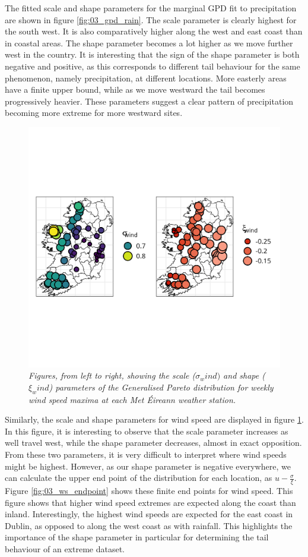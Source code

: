 \documentclass{article}
\numberwithin{equation}{section}
\begin{document}
The fitted scale and shape parameters for the marginal GPD fit to precipitation are shown in figure \ref{fig:03_gpd_rain}.
The scale parameter is clearly highest for the south west. 
It is also comparatively higher along the west and east coast than in coastal areas.
The shape parameter becomes a lot higher as we move further west in the country. 
It is interesting that the sign of the shape parameter is both negative and positive, as this corresponds to different tail behaviour for the same phenomenon, namely precipitation, at different locations.
More easterly areas have a finite upper bound, while as we move westward the tail becomes progressively heavier.
These parameters suggest a clear pattern of precipitation becoming more extreme for more westward sites.

\begin{figure}[H]
    \centering
    \includegraphics[width = 0.9\linewidth]{plots/033_gpd_ws.png}
    \caption{\emph{Figures, from left to right, showing the scale ($\sigma_wind)$ and shape ($\xi_wind$) parameters of the Generalised Pareto distribution for weekly wind speed maxima at each Met Éireann weather station.}}
    \label{fig:03_gpd_ws}
\end{figure}

Similarly, the scale and shape parameters for wind speed are displayed in figure \ref{fig:03_gpd_ws}.
In this figure, it is interesting to observe that the scale parameter increases as well travel west, while the shape parameter decreases, almost in exact opposition.
From these two parameters, it is very difficult to interpret where wind speeds might be highest. 
However, as our shape parameter is negative everywhere, we can calculate the upper end point of the distribution for each location, as $u - \frac{\sigma}{\xi}$.
Figure \ref{fig:03_ws_endpoint} shows these finite end points for wind speed.
This figure shows that higher wind speed extremes are expected along the coast than inland. 
Interestingly, the highest wind speeds are expected for the east coast in Dublin, as opposed to along the west coast as with rainfall.
This highlights the importance of the shape parameter in particular for determining the tail behaviour of an extreme dataset.
\end{document}
